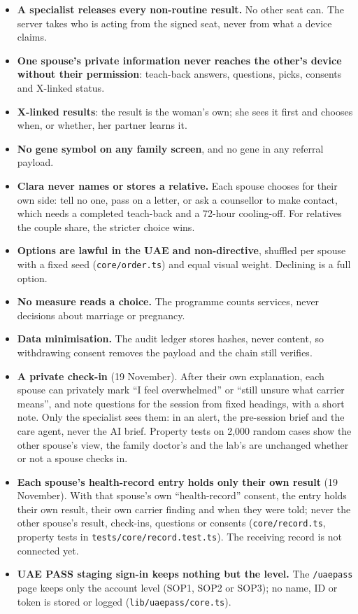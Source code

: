\documentclass[10.5pt,a4paper]{article}
\newcommand{\code}[1]{\texttt{\small #1}}
\newcommand{\file}[1]{\leavevmode\textcolor{muted}{\texttt{\small #1}}}
\begin{document}
\begin{itemize}
  \item \textbf{A specialist releases every non-routine result.} No other seat can. The server takes who is acting
        from the signed seat, never from what a device claims.
  \item \textbf{One spouse's private information never reaches the other's device without their permission}:
        teach-back answers, questions, picks, consents and X-linked status.
  \item \textbf{X-linked results}: the result is the woman's own; she sees it first and chooses when, or whether, her
        partner learns it.
  \item \textbf{No gene symbol on any family screen}, and no gene in any referral payload.
  \item \textbf{Clara never names or stores a relative.} Each spouse chooses for their own side: tell no one, pass on a
        letter, or ask a counsellor to make contact, which needs a completed teach-back and a 72-hour cooling-off.
        For relatives the couple share, the stricter choice wins.
  \item \textbf{Options are lawful in the UAE and non-directive}, shuffled per spouse with a fixed seed
        (\file{core/order.ts}) and equal visual weight. Declining is a full option.
  \item \textbf{No measure reads a choice.} The programme counts services, never decisions about marriage or
        pregnancy.
  \item \textbf{Data minimisation.} The audit ledger stores hashes, never content, so withdrawing consent removes the
        payload and the chain still verifies.
  \item \textbf{A private check-in} (19 November). After their own explanation, each spouse can privately mark ``I feel
        overwhelmed'' or ``still unsure what carrier means'', and note questions for the session from fixed
        headings, with a short note. Only the specialist sees them: in an alert, the pre-session brief and the care
        agent, never the AI brief. Property tests on 2,000 random cases show the other spouse's view, the family
        doctor's and the lab's are unchanged whether or not a spouse checks in.
  \item \textbf{Each spouse's health-record entry holds only their own result} (19 November). With that spouse's own
        ``health-record'' consent, the entry holds their own result, their own carrier finding and when they were told;
        never the other spouse's result, check-ins, questions or consents (\file{core/record.ts}, property tests in
        \file{tests/core/record.test.ts}). The receiving record is not connected yet.
  \item \textbf{UAE PASS staging sign-in keeps nothing but the level.} The \code{/uaepass} page keeps only the account
        level (SOP1, SOP2 or SOP3); no name, ID or token is stored or logged (\file{lib/uaepass/core.ts}).
\end{itemize}
\end{document}
